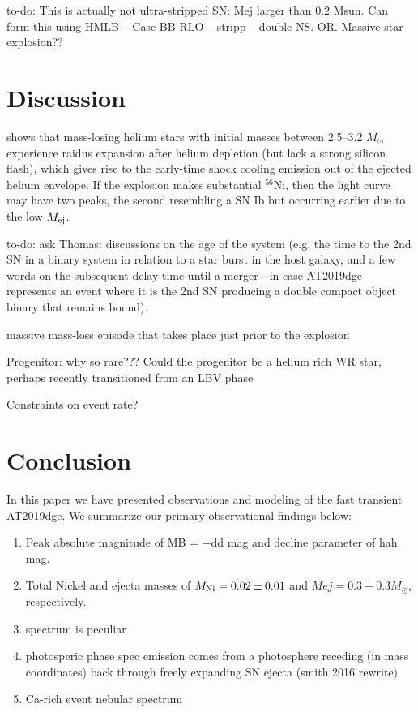 \documentclass[twocolumn]{aastex63}
\newcommand{\todo}[1]{{\color{magenta} to-do: {#1}}}
\begin{document}
\begin{CJK*}{UTF8}{gbsn}
\todo{This is actually not ultra-stripped SN: Mej larger than 0.2 Msun. Can form this using HMLB -- 
Case BB RLO -- stripp -- double NS.  OR. Massive star explosion??}

\section{Discussion}

\citet{Woosley2019} shows that mass-losing helium stars with initial masses between 2.5--3.2 
$M_\odot$ experience raidus expansion after helium depletion (but lack a strong silicon flash), which 
gives rise to the early-time shock 
cooling emission out of the ejected helium envelope. If the explosion makes substantial $^{56}$Ni, then 
the light curve may have two peaks, the second resembling a SN Ib but occurring earlier due to the low 
$M_{\rm ej}$.


\todo{ask Thomas: discussions on the age of the system (e.g. the time to the 2nd SN in a binary 
system in relation 
to a star burst in the host galaxy, and a few words on the subsequent delay time until a merger - in 
case 
AT2019dge represents an event where it is the 2nd SN producing a double compact object binary that 
remains 
bound).}

massive mass-loss episode that takes place just prior to the explosion \citep{Shiode2014}

Progenitor: why so rare???
Could the progenitor be a helium rich WR star, perhaps recently transitioned from an LBV phase 

Constraints on event rate?



\section{Conclusion}
In this paper we have presented observations and modeling of the fast transient AT2019dge. We 
summarize our primary observational findings below:
\begin{enumerate}[label=(\alph*)]
	\item Peak absolute magnitude of MB = −dd mag and decline parameter of hah mag.
	\item  Total Nickel and ejecta masses of $M_{\rm Ni} = 0.02 \pm 0.01$ and $Mej = 0.3 \pm 0.3 
	M_\odot$, respectively.
	\item spectrum is peculiar
	\item photosperic phase spec emission comes from a photosphere receding (in mass coordinates) 
	back through freely expanding SN ejecta (smith 2016 rewrite)
	\item Ca-rich event nebular spectrum
\end{enumerate}


\end{CJK*}
\end{document}
